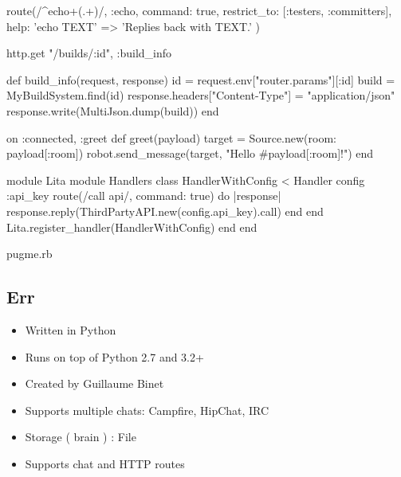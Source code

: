 \documentclass[
paper=128mm:96mm, %
fontsize=11pt, %
pagesize, %
parskip=half-, %
]{scrartcl} %
\theoremstyle{mythmstyle} %
\begin{document}

\begin{rubycode}
  route(/^echo\s+(.+)/, :echo, command: true, restrict_to: [:testers, :committers], help: {
    'echo TEXT' => 'Replies back with TEXT.'
  })
\end{rubycode}
\begin{rubycode}
  http.get "/builds/:id", :build_info

  def build_info(request, response)
    id = request.env["router.params"][:id]
    build = MyBuildSystem.find(id)
    response.headers["Content-Type"] = "application/json"
    response.write(MultiJson.dump(build))
  end
\end{rubycode}
\begin{rubycode}
  on :connected, :greet
  def greet(payload)
    target = Source.new(room: payload[:room])
    robot.send_message(target, "Hello #{payload[:room]}!")
  end
\end{rubycode}
\begin{rubycode}
  module Lita
    module Handlers
      class HandlerWithConfig < Handler
        config :api_key
        route(/call api/, command: true) do |response|
          response.reply(ThirdPartyAPI.new(config.api_key).call)
        end
      end
      Lita.register_handler(HandlerWithConfig)
    end
  end
\end{rubycode}
\clearpage


pugme.rb
\clearpage


\subsection{Err}
\begin{itemize}
\item Written in Python
\item Runs on top of Python 2.7 and 3.2+
\item Created by Guillaume Binet
\item Supports multiple chats: Campfire, HipChat, IRC
\item Storage ( brain ) : File
\item Supports chat and HTTP routes
\end{itemize}
\clearpage

\end{document}
